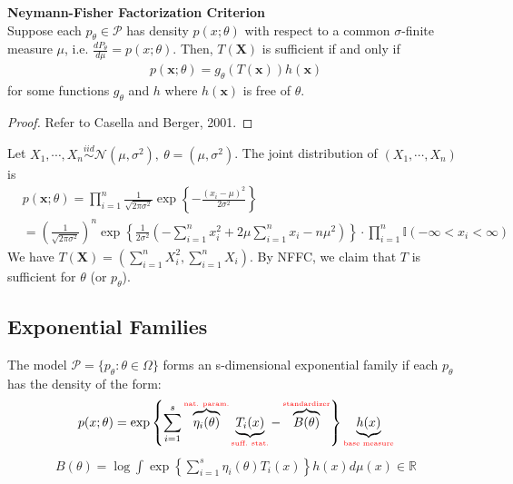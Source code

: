 \begin{theorem}
    \textbf{Neymann-Fisher Factorization Criterion}\\
    Suppose each $p_\theta\in\mathcal{P}$ has density $p(x;\theta)$ 
    with respect to a common $\sigma$-finite measure $\mu$, 
    i.e. $\frac{dP_\theta}{d\mu}=p(x;\theta)$. 
    Then, $T(\boldsymbol{X})$ is sufficient if and only if 
    \begin{gather}
        p(\boldsymbol{x};\theta)=g_\theta(T(\boldsymbol{x}))h(\boldsymbol{x})
    \end{gather}
    for some functions $g_\theta$ and $h$ where $h(\boldsymbol{x})$ is free of $\theta$.
\end{theorem}
\begin{proof}
    Refer to Casella and Berger, 2001.
\end{proof}

\begin{example}
    Let $X_1,\cdots,X_n\overset{iid}{\sim}\mathcal{N}(\mu,\sigma^2),~\theta=(\mu,\sigma^2)$. 
    The joint distribution of $(X_1,\cdots,X_n)$ is 
    {\scriptsize \begin{align}
        &p(\boldsymbol{x};\theta)= \prod_{i=1}^n\frac{1}{\sqrt{2\pi\sigma^2}}
        \exp\left\{ -\frac{(x_i-\mu)^2}{2\sigma^2} \right\}\\
        &= \left(\frac{1}{\sqrt{2\pi\sigma^2}}\right)^n\exp\left\{ 
        \frac{1}{2\sigma^2}\left( -\sum_{i=1}^n{x_i^2}+2\mu\sum_{i=1}^n{x_i}-n\mu^2 \right) 
        \right\}\cdot\prod_{i=1}^n\mathbb{I}(-\infty<x_i<\infty)
    \end{align}}
    We have $T(\boldsymbol{X})=(\sum_{i=1}^nX_i^2,\sum_{i=1}^n{X_i})$.
    By NFFC, we claim that $T$ is sufficient for $\theta$ (or $p_\theta$).
\end{example}


\subsection{Exponential Families}
The model $\mathcal{P}=\{p_\theta:\theta\in\Omega\}$ forms an s-dimensional exponential family 
if each $p_\theta$ has the density of the form:
{\Large
\begin{gather}
    p(x;\theta)=\exp\left\{ \sum_{i=1}^s 
    \overbrace{\eta_i(\theta)}^\text{\tiny \color{red} nat. param.} 
    \underbrace{T_i(x)}_\text{\tiny \color{red} suff. stat.}
    -\overbrace{B(\theta)}^\text{\tiny \color{red} standardizer} \right\}
    \underbrace{h(x)}_\text{\tiny \color{red} base measure}
\end{gather}}
\begin{gather}
    B(\theta)=\log{
    \int\exp\left\{ \sum_{i=1}^s\eta_i(\theta)T_i(x) \right\}h(x)d\mu(x)
    }\in\mathbb{R}
\end{gather}

